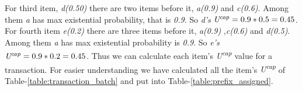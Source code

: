 	For third item, \emph{d(0.50)} there are two items before it, \emph{a(0.9)} and \emph{c(0.6)}. Among them \emph{a} has max existential probability, that is \emph{0.9}. So \emph{d's } $\emph{U\textsuperscript{cap}} = 0.9*0.5 = 0.45$.\\
	For fourth item \emph{e(0.2)} there are three items before it, \emph{a(0.9)} ,\emph{c(0.6)} and \emph{d(0.5)}. Among them \emph{a} has max existential probability is \emph{0.9}. So \emph{e's}  $\emph{U\textsuperscript{cap}} = 0.9*0.2 = 0.45$. Thus we can calculate each item's \emph{U\textsuperscript{cap}} value for a transaction. For easier understanding we have calculated all the item's \emph{U\textsuperscript{cap}} of Table-\ref{table:transaction_batch} and put into Table-\ref{table:prefix_assigned}.
	
	
	

